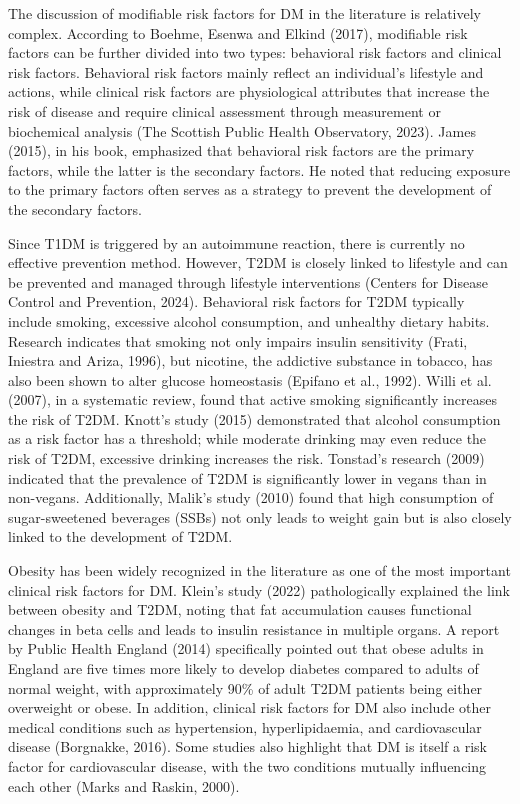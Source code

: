 The discussion of modifiable risk factors for DM in the literature is relatively complex. According to Boehme, Esenwa and Elkind (2017), modifiable risk factors can be further divided into two types: behavioral risk factors and clinical risk factors. Behavioral risk factors mainly reflect an individual's lifestyle and actions, while clinical risk factors are physiological attributes that increase the risk of disease and require clinical assessment through measurement or biochemical analysis (The Scottish Public Health Observatory, 2023). James (2015), in his book, emphasized that behavioral risk factors are the primary factors, while the latter is the secondary factors. He noted that reducing exposure to the primary factors often serves as a strategy to prevent the development of the secondary factors.

Since T1DM is triggered by an autoimmune reaction, there is currently no effective prevention method. However, T2DM is closely linked to lifestyle and can be prevented and managed through lifestyle interventions (Centers for Disease Control and Prevention, 2024). Behavioral risk factors for T2DM typically include smoking, excessive alcohol consumption, and unhealthy dietary habits. Research indicates that smoking not only impairs insulin sensitivity (Frati, Iniestra and Ariza, 1996), but nicotine, the addictive substance in tobacco, has also been shown to alter glucose homeostasis (Epifano et al., 1992). Willi et al. (2007), in a systematic review, found that active smoking significantly increases the risk of T2DM. Knott's study (2015) demonstrated that alcohol consumption as a risk factor has a threshold; while moderate drinking may even reduce the risk of T2DM, excessive drinking increases the risk. Tonstad's research (2009) indicated that the prevalence of T2DM is significantly lower in vegans than in non-vegans. Additionally, Malik's study (2010) found that high consumption of sugar-sweetened beverages (SSBs) not only leads to weight gain but is also closely linked to the development of T2DM.

Obesity has been widely recognized in the literature as one of the most important clinical risk factors for DM. Klein's study (2022) pathologically explained the link between obesity and T2DM, noting that fat accumulation causes functional changes in beta cells and leads to insulin resistance in multiple organs. A report by Public Health England (2014) specifically pointed out that obese adults in England are five times more likely to develop diabetes compared to adults of normal weight, with approximately 90\% of adult T2DM patients being either overweight or obese. In addition, clinical risk factors for DM also include other medical conditions such as hypertension, hyperlipidaemia, and cardiovascular disease (Borgnakke, 2016). Some studies also highlight that DM is itself a risk factor for cardiovascular disease, with the two conditions mutually influencing each other (Marks and Raskin, 2000).


